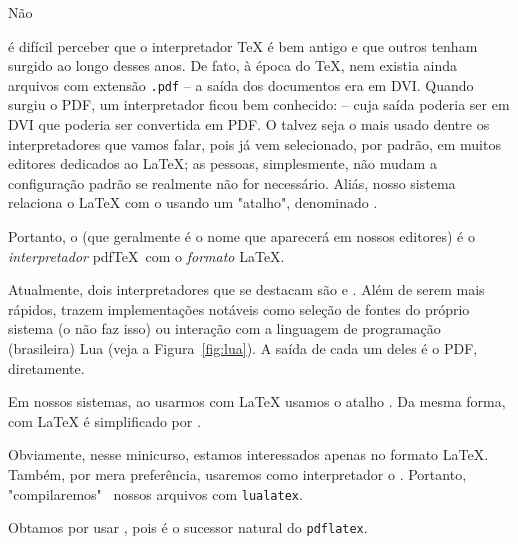 Não
é difícil perceber que o interpretador \TeX{} é bem antigo e que outros tenham
surgido ao longo desses anos.
De fato, à época do \TeX, nem existia ainda arquivos com extensão  \texttt{.pdf} 
-- a saída dos documentos era em DVI.
Quando surgiu o PDF, um interpretador ficou bem conhecido:  -- cuja 
saída poderia ser em DVI que poderia ser convertida em PDF. 
O  talvez seja o mais usado dentre os interpretadores que vamos 
falar, pois já vem selecionado, por padrão, em muitos editores dedicados ao 
\LaTeX {}; 
as pessoas, simplesmente, não mudam a configuração padrão se realmente não 
for necessário.
Aliás, nosso sistema relaciona o \LaTeX{} com o  usando um "atalho", 
denominado .

Portanto, o  (que geralmente é o nome que aparecerá em nossos 
editores) é o \textit{interpretador} pdf\TeX\ com o \textit{formato} \LaTeX. 

Atualmente, dois interpretadores que se destacam são  e .
Além de serem mais rápidos, trazem implementações notáveis como seleção de fontes 
do próprio sistema (o  não faz isso) ou interação com a linguagem 
de programação (brasileira) Lua (veja a Figura~\ref{fig:lua}). 
A saída de cada um deles é o PDF, diretamente.

Em nossos sistemas, ao usarmos  com \LaTeX{} usamos o atalho 
.
Da mesma forma,  com \LaTeX{} é simplificado por .

Obviamente, nesse minicurso, estamos interessados apenas no formato \LaTeX.
Também, por mera preferência, usaremos como interpretador o .
Portanto, "compilaremos" \, nossos arquivos com \texttt{lualatex}.

Obtamos por usar \lualatex, pois é o sucessor natural do \texttt{pdflatex}. 

